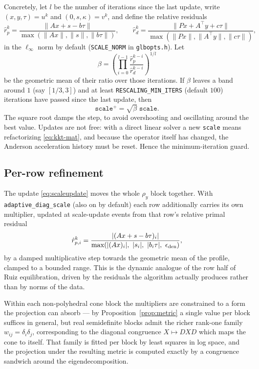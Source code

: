 \documentclass[11pt,a4paper]{article}
\newcommand{\tr}{^\top}
\theoremstyle{plain}
\begin{document}
Concretely, let $l$ be the number of iterations since the last update, write
$(x, y, \tau) = u^k$ and $(0, s, \kappa) = v^k$, and define the relative
residuals
\begin{equation}\label{eq:relres}
\hat r^k_p = \frac{\|Ax + s - b\tau\|}{\max(\|Ax\|, \|s\|, \|b\tau\|)},
\qquad
\hat r^k_d = \frac{\|Px + A\tr y + c\tau\|}{\max(\|Px\|, \|A\tr y\|, \|c\tau\|)} ,
\end{equation}
in the $\ell_\infty$ norm by default (\texttt{SCALE\_NORM} in
\texttt{glbopts.h}). Let
\begin{equation}\label{eq:beta}
\beta = \left(\prod_{i=0}^{l-1}
        \frac{\hat r^{k-i}_p}{\hat r^{k-i}_d}\right)^{1/l}
\end{equation}
be the geometric mean of their ratio over those iterations. If $\beta$ leaves a
band around $1$ (say $[1/3, 3]$) and at least \texttt{RESCALING\_MIN\_ITERS}
(default $100$) iterations have passed since the last update, then
\begin{equation}\label{eq:scaleupdate}
\texttt{scale}^+ = \sqrt{\beta}\;\texttt{scale} .
\end{equation}
The square root damps the step, to avoid overshooting and oscillating around
the best value. Updates are not free: with a direct linear solver a new
\texttt{scale} means refactorizing \eqref{eq:kkt-mat}, and because the operator
itself has changed, the Anderson acceleration history must be reset. Hence the
minimum-iteration guard.

\subsection{Per-row refinement}

The update \eqref{eq:scaleupdate} moves the whole $\rho_y$ block together. With
\texttt{adaptive\_diag\_scale} (also on by default) each row additionally
carries its own multiplier, updated at scale-update events from that row's
relative primal residual
\begin{equation}\label{eq:rowres}
\hat r^k_{p,i} = \frac{|(Ax + s - b\tau)_i|}
                      {\max(|(Ax)_i|,\ |s_i|,\ |b_i\tau|,\ \epsilon_{\rm den})} ,
\end{equation}
by a damped multiplicative step towards the geometric mean of the profile,
clamped to a bounded range. This is the dynamic analogue of the row half of
Ruiz equilibration, driven by the residuals the algorithm actually produces
rather than by norms of the data.

Within each non-polyhedral cone block the multipliers are constrained to a form
the projection can absorb --- by Proposition~\ref{prop:metric} a single value
per block suffices in general, but real semidefinite blocks admit the richer
rank-one family $w_{ij} = \delta_i\delta_j$, corresponding to the diagonal
congruence $X \mapsto DXD$ which maps the cone to itself. That family is fitted
per block by least squares in log space, and the projection under the resulting
metric is computed exactly by a congruence sandwich around the
eigendecomposition.
\end{document}
